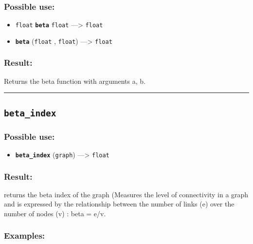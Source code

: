\documentclass[]{book}
\providecommand{\tightlist}{%
  \setlength{\itemsep}{0pt}\setlength{\parskip}{0pt}}
\theoremstyle{definition}
\theoremstyle{definition}
\theoremstyle{definition}
\theoremstyle{remark}
\begin{document}
\subsubsection{Possible use:}\label{possible-use-65}

\begin{itemize}
\tightlist
\item
  \texttt{float} \textbf{\texttt{beta}} \texttt{float} ---\textgreater{}
  \texttt{float}
\item
  \textbf{\texttt{beta}} (\texttt{float} , \texttt{float})
  ---\textgreater{} \texttt{float}
\end{itemize}

\subsubsection{Result:}\label{result-64}

Returns the beta function with arguments a, b.

\begin{center}\rule{0.5\linewidth}{\linethickness}\end{center}

\subsection{\texorpdfstring{\texttt{beta\_index}}{beta\_index}}\label{beta_index}

\subsubsection{Possible use:}\label{possible-use-66}

\begin{itemize}
\tightlist
\item
  \textbf{\texttt{beta\_index}} (\texttt{graph}) ---\textgreater{}
  \texttt{float}
\end{itemize}

\subsubsection{Result:}\label{result-65}

returns the beta index of the graph (Measures the level of connectivity
in a graph and is expressed by the relationship between the number of
links (e) over the number of nodes (v) : beta = e/v.

\subsubsection{Examples:}\label{examples-52}
\end{document}
